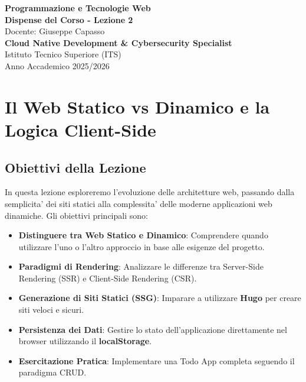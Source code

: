 \documentclass[11pt,a4paper]{report}
\begin{document}
\begin{titlepage}
    \centering
    \vspace*{4cm}
    {\Huge \textbf{\color{primary} Programmazione e Tecnologie Web}} \\[1.5cm]
    {\Large \textbf{Dispense del Corso - Lezione 2}} \\[0.5cm]
    {\large Docente: Giuseppe Capasso} \\[1.5cm]
    {\normalsize \textbf{Cloud Native Development \& Cybersecurity Specialist}} \\
    {\normalsize Istituto Tecnico Superiore (ITS)} \\
    \vfill
    {\normalsize Anno Accademico 2025/2026}
\end{titlepage}

\newpage

\chapter*{Il Web Statico vs Dinamico e la Logica Client-Side}

\section*{Obiettivi della Lezione}
In questa lezione esploreremo l'evoluzione delle architetture web, passando dalla semplicita' dei siti statici alla complessita' delle moderne applicazioni web dinamiche. Gli obiettivi principali sono:
\begin{itemize}
    \item \textbf{Distinguere tra Web Statico e Dinamico}: Comprendere quando utilizzare l'uno o l'altro approccio in base alle esigenze del progetto.
    \item \textbf{Paradigmi di Rendering}: Analizzare le differenze tra Server-Side Rendering (SSR) e Client-Side Rendering (CSR).
    \item \textbf{Generazione di Siti Statici (SSG)}: Imparare a utilizzare \textbf{Hugo} per creare siti veloci e sicuri.
    \item \textbf{Persistenza dei Dati}: Gestire lo stato dell'applicazione direttamente nel browser utilizzando il \textbf{localStorage}.
    \item \textbf{Esercitazione Pratica}: Implementare una Todo App completa seguendo il paradigma CRUD.
\end{itemize}
\end{document}
